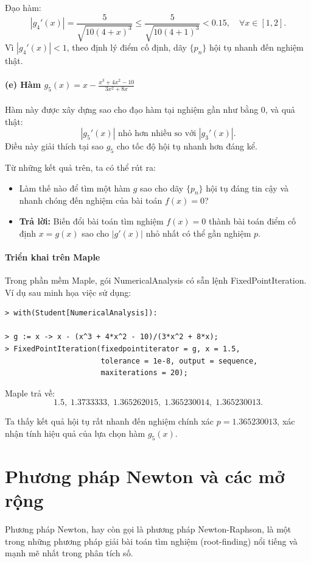 Đạo hàm:
\[
|g_4'(x)| = \frac{5}{\sqrt{10(4+x)^3}} \le \frac{5}{\sqrt{10(4+1)^3}} < 0.15, \quad \forall x \in [1,2].
\]
Vì $|g_4'(x)| < 1$, theo định lý điểm cố định, dãy $\{p_n\}$ hội tụ nhanh đến nghiệm thật.

\paragraph*{(e) Hàm $g_5(x) = x - \frac{x^3 + 4x^2 - 10}{3x^2 + 8x}$}

Hàm này được xây dựng sao cho đạo hàm tại nghiệm gần như bằng 0, và quả thật:
\[
|g_5'(x)| \text{ nhỏ hơn nhiều so với } |g_3'(x)|.
\]
Điều này giải thích tại sao $g_5$ cho tốc độ hội tụ nhanh hơn đáng kể.

\medskip
Từ những kết quả trên, ta có thể rút ra:

\begin{itemize}
\item Làm thế nào để tìm một hàm $g$ sao cho dãy $\{p_n\}$ hội tụ đáng tin cậy và nhanh chóng đến nghiệm của bài toán $f(x)=0$?
\item \textbf{Trả lời:} Biến đổi bài toán tìm nghiệm $f(x)=0$ thành bài toán điểm cố định $x=g(x)$ sao cho $|g'(x)|$ nhỏ nhất có thể gần nghiệm $p$.
\end{itemize}

\paragraph*{Triển khai trên Maple}

Trong phần mềm Maple, gói NumericalAnalysis có sẵn lệnh FixedPointIteration.  
Ví dụ sau minh họa việc sử dụng:

\begin{verbatim}
> with(Student[NumericalAnalysis]):

> g := x -> x - (x^3 + 4*x^2 - 10)/(3*x^2 + 8*x);
> FixedPointIteration(fixedpointiterator = g, x = 1.5,
                      tolerance = 1e-8, output = sequence,
                      maxiterations = 20);
\end{verbatim}

Maple trả về:
\[
1.5,\; 1.3733333,\; 1.365262015,\; 1.365230014,\; 1.365230013.
\]

Ta thấy kết quả hội tụ rất nhanh đến nghiệm chính xác $p = 1.365230013$,
xác nhận tính hiệu quả của lựa chọn hàm $g_5(x)$.


\section{Phương pháp Newton và các mở rộng}
Phương pháp Newton, hay còn gọi là phương pháp Newton-Raphson, là một trong những phương pháp giải bài toán tìm nghiệm (root-finding) nổi tiếng và mạnh mẽ nhất trong phân tích số.

